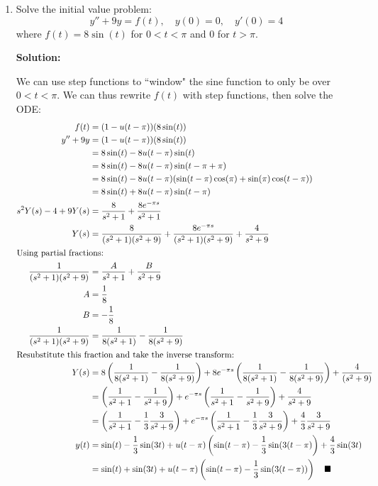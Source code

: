 \documentclass[letterpaper, fontsize=11pt]{scrartcl} %
\numberwithin{equation}{section} %
\numberwithin{figure}{section} %
\numberwithin{table}{section} %
\begin{document}
\begin{enumerate}
\item Solve the initial value problem: $$y'' + 9y = f(t),\quad y(0) = 0,\quad y'(0) = 4$$ where $f(t) = 8\sin(t)$ for $0 < t < \pi$ and 0 for $t > \pi$.
\par \textbf{Solution:}
\par We can use step functions to ``window" the sine function to only be over $0 < t < \pi$. We can thus rewrite $f(t)$ with step functions, then solve the ODE:
\begin{align*}
f(t)&= (1-u(t-\pi)) (8\sin(t))\\
y'' + 9y &= (1-u(t-\pi)) (8\sin(t))\\
&= 8\sin(t) - 8u(t-\pi)\sin(t)\\
&= 8\sin(t) - 8u(t-\pi)\sin(t-\pi + \pi)\\
&= 8\sin(t) - 8u(t-\pi)(\sin(t-\pi)\cos(\pi) + \sin(\pi)\cos(t-\pi))\\
&= 8\sin(t) + 8u(t-\pi)\sin(t-\pi)\\
s^2Y(s) - 4 + 9Y(s) &= \frac{8}{s^2 + 1} + \frac{8e^{-\pi s}}{s^2 + 1}\\
Y(s) &= \frac{8}{(s^2 + 1)(s^2 + 9)} + \frac{8e^{-\pi s}}{(s^2 + 1)(s^2 + 9)} + \frac{4}{s^2 + 9}\\
\intertext{Using partial fractions:}
\frac{1}{(s^2 + 1)(s^2 + 9)} &= \frac{A}{s^2 + 1} + \frac{B}{s^2 + 9}\\
A &= \frac{1}{8} \\
B&= - \frac{1}{8}\\
\frac{1}{(s^2 + 1)(s^2 + 9)} &= \frac{1}{8(s^2 + 1)} - \frac{1}{8(s^2 + 9)}\\
\intertext{Resubstitute this fraction and take the inverse transform:}
Y(s) &= 8\left( \frac{1}{8(s^2 + 1)} - \frac{1}{8(s^2 + 9)}\right) + 8e^{-\pi s}\left( \frac{1}{8(s^2 + 1)} - \frac{1}{8(s^2 + 9)}\right) + \frac{4}{(s^2 + 9)}\\
&= \left( \frac{1}{s^2 + 1} - \frac{1}{s^2 + 9}\right) + e^{-\pi s}\left( \frac{1}{s^2 + 1} - \frac{1}{s^2 + 9}\right) + \frac{4}{s^2 + 9}\\
&= \left( \frac{1}{s^2 + 1} - \frac{1}{3}\frac{3}{s^2 + 9}\right) + e^{-\pi s}\left( \frac{1}{s^2 + 1} - \frac{1}{3}\frac{3}{s^2 + 9}\right) + \frac{4}{3}\frac{3}{s^2 + 9}\\
y(t) &= \sin(t) - \frac{1}{3}\sin(3t) + u(t-\pi)\left(\sin(t-\pi) - \frac{1}{3}\sin(3(t-\pi)\right) + \frac{4}{3}\sin(3t)\\
&= \sin(t) + \sin(3t) + u(t-\pi)\left (\sin(t-\pi) - \frac{1}{3}\sin(3(t-\pi))\right)  \quad\blacksquare 
\end{align*}


\end{enumerate}
\end{document}
